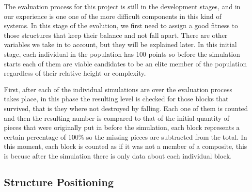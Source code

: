 \documentclass[conference]{IEEEtran}
\begin{document}
    The evaluation process for this project is still in the development stages,
    and in our experience is one one of the more difficult components in this
    kind of systems. In this stage of the evolution, we first need to assign a
    good fitness to those structures that keep their balance and not fall apart.
    There are other variables we take in to account, but they will be explained
    later. In this initial stage, each individual in the population has 100
    points so before the simulation starts each of them are viable candidates to
    be an elite member of the population regardless of their relative height or
    complexity.
    
    First, after each of the individual simulations are over the evaluation process
    takes place, in this phase the resulting level is checked for those blocks that
    survived, that is they where not destroyed by falling. Each one
    of them is counted and then the resulting number is compared to that of the
    initial quantity of pieces that were originally put in before the simulation,
    each block represents a certain percentage of 100\% so the missing pieces 
    are subtracted from the total. In this moment, each block is counted as if 
    it was not a member of a composite, this is becuse after the simulation there is
    only data about each individual block.

    \subsection{Structure Positioning}
\end{document}
